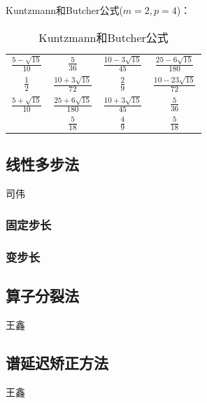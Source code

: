 Kuntzmann和Butcher公式($m=2,p=4$)：
\begin{table}[htbp!]\label{coff3}
		\centering
		\begin{tabular}{c|ccc}
				$\frac{5-\sqrt{15}}{10}$&$ \frac{5}{36}$ &$ \frac{10-3\sqrt{15}}{45}$ &$ \frac{25-6\sqrt{15}}{180}$\\ 
				$\frac{1}{2}$& $\frac{10+3\sqrt{15}}{72}$ &$\frac{2}{9}$ & $\frac{10-23\sqrt{15}}{72}$ \\
                                $\frac{5+\sqrt{15}}{10}$& $\frac{25+6\sqrt{15}}{180}$ & $\frac{10+3\sqrt{15}}{45}$ & $\frac{5}{36}$\\\hline
                                                        & $\frac{5}{18}$ & $\frac{4}{9}$ &$\frac{5}{18}$
		\end{tabular}\caption{Kuntzmann和Butcher公式}
\end{table}
\subsection{线性多步法}
{\color{red}\begin{center}
     司伟
\end{center}}
\subsubsection{固定步长}
\subsubsection{变步长}



\subsection{算子分裂法}
{\color{red}\begin{center}
    王鑫
\end{center}}


\subsection{谱延迟矫正方法}
{\color{red}\begin{center}
    王鑫
\end{center}}



